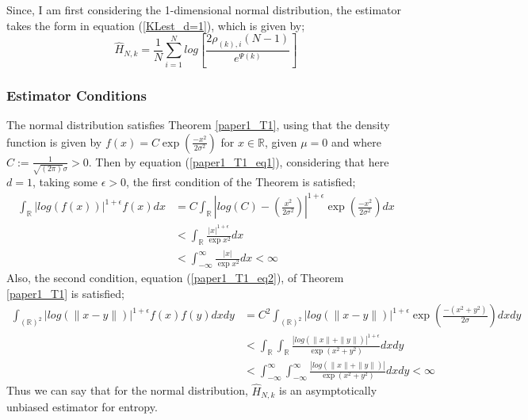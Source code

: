 \documentclass{article}
\begin{document}
Since, I am first considering the 1-dimensional normal distribution, the estimator takes the form in equation (\ref{KLest_d=1}), which is given by;
\begin{equation}
\hat{H}_{N, k} =  \frac{1}{N} \sum_{i=1}^{N} log \left[ \frac{2\rho_{(k),i}(N-1)}{e^{\Psi(k)}} \right]\nonumber
\end{equation}




\subsubsection{Estimator Conditions} \label{N_Conditions}
The normal distribution satisfies Theorem \ref{paper1_T1}, using that the density function is given by $f(x) = C \exp{ \left( \frac{-x^2}{2\sigma^2} \right)}$ for $x \in \mathbb{R}$, given $\mu = 0$ and where $C:= \frac{1}{\sqrt{(2\pi)} \sigma} > 0$. Then by equation (\ref{paper1_T1_eq1}), considering that here $d=1$, taking some $\epsilon >0$, the first condition of the Theorem is satisfied;
\begin{align} \nonumber
\int_{\mathbb{R}} | log(f(x))|^{1 + \epsilon} f(x) dx  &= C \int_{\mathbb{R}} \left| log \left( C \right) -  \left( \frac{x^2}{2\sigma^2} \right) \right|^{1 + \epsilon} \exp{ \left( \frac{-x^2}{2\sigma^2} \right)} dx \\ \nonumber
&< \int_{\mathbb{R}} \frac{|x|^{1 + \epsilon}}{ \exp{x^2}} dx \\ \nonumber
&< \int_{-\infty}^{\infty} \frac{|x|}{ \exp{x^2}} dx < \infty \nonumber
\end{align}
Also, the second condition, equation (\ref{paper1_T1_eq2}), of Theorem \ref{paper1_T1} is satisfied;
\begin{align} \nonumber
\int_{(\mathbb{R})^2} | log(\|x-y\|)|^{1+ \epsilon} f(x) f(y) dx dy  &= C^2 \int_{(\mathbb{R})^2} | log(\|x-y\|)|^{1+ \epsilon} \exp{\left(\frac{-(x^2 + y^2)}{2 \sigma}\right)} dx dy \\ \nonumber
&< \int_{\mathbb{R}} \int_{\mathbb{R}} \frac{| log(\|x\| + \|y\|)|^{1+ \epsilon}}{\exp{(x^2 + y^2)}} dx dy \\ \nonumber
&< \int_{-\infty}^{\infty} \int_{-\infty}^{\infty} \frac{| log(\|x\| + \|y\|)|}{\exp{(x^2 + y^2)}} dx dy < \infty  \nonumber
\end{align}
Thus we can say that for the normal distribution, $\hat{H}_{N,k}$ is an asymptotically unbiased estimator for entropy. 
\end{document}
